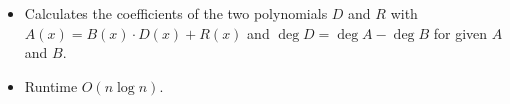 \begin{itemize}
	\item Calculates the coefficients of the two polynomials $D$ and $R$ with $A(x)=B(x)\cdot D(x)+R(x)$ and $\deg D=\deg A-\deg B$ for given $A$ and $B$.
	\item Runtime $O\left(n \log n\right)$.
\end{itemize}
